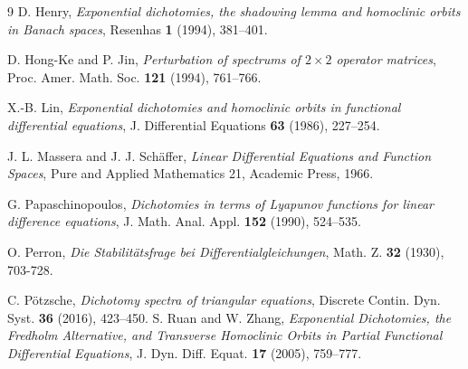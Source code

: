 \documentclass[11pt,reqno,a4paper]{amsart}
\theoremstyle{plain}
\numberwithin{equation}{section}
\theoremstyle{remark}
\begin{document}
\begin{thebibliography}{9}
D. Henry, \emph{Exponential dichotomies, the shadowing lemma and homoclinic orbits in Banach spaces}, Resenhas \textbf{1} (1994), 381--401.

D. Hong-Ke and P. Jin, \emph{Perturbation of spectrums of $2\times 2$ operator matrices}, Proc. Amer. Math. Soc. \textbf{121} (1994), 761--766.


X.-B. Lin, \emph{Exponential dichotomies and homoclinic orbits in functional differential equations}, J. Differential Equations \textbf{63} (1986), 227--254.

J. L. Massera and  J. J. Sch\"affer, \emph{Linear Differential Equations and Function Spaces}, Pure and Applied Mathematics 21, Academic Press, 1966.


G. Papaschinopoulos, \emph{Dichotomies in terms of Lyapunov functions for linear difference equations}, J. Math. Anal. Appl. \textbf{152} (1990), 524--535.

O. Perron, \emph{Die Stabilit\"atsfrage bei Differentialgleichungen},  Math. Z. \textbf{32} (1930), 703-728.

  C. P\" otzsche, \emph{Dichotomy spectra of triangular equations}, Discrete Contin. Dyn. Syst. \textbf{36} (2016),  423--450.
S. Ruan and W. Zhang, \emph{Exponential Dichotomies, the Fredholm Alternative,
and Transverse Homoclinic Orbits in Partial
Functional Differential Equations}, J. Dyn. Diff. Equat. \textbf{17} (2005), 759--777.


\end{thebibliography}
\end{document}
